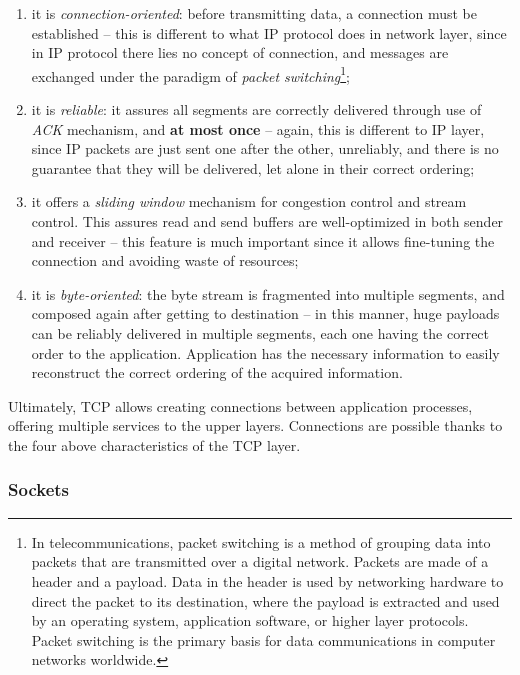 \documentclass[10pt]{\classname}
\begin{document}
\begin{enumerate}
	\item it is \emph{connection-oriented}: before transmitting data, a
		connection must be established \--- this is different to what
		IP protocol does in network layer, since in IP protocol there
        lies no concept of connection, and messages are exchanged under the
        paradigm of \emph{packet switching}\footnote{In telecommunications,
        packet switching is a method of grouping data into packets that are
    transmitted over a digital network. Packets are made of a header and a
payload. Data in the header is used by networking hardware to direct the packet
to its destination, where the payload is extracted and used by an operating
system, application software, or higher layer protocols. Packet switching is
the primary basis for data communications in computer networks worldwide. };
	\item it is \emph{reliable}: it assures all segments are correctly
		delivered through use of \emph{ACK} mechanism, and \textbf{at
		most once} \--- again, this is different to IP layer, since IP
        packets are just sent one after the other, unreliably, and there is no
        guarantee that they will be delivered, let alone in their correct
        ordering;
	\item it offers a \emph{sliding window} mechanism for congestion control
		and stream control. This assures read and send buffers are
		well-optimized in both sender and receiver \--- this feature is
		much important since it allows fine-tuning the connection and
		avoiding waste of resources;
	\item it is \emph{byte-oriented}: the byte stream is fragmented into
		multiple segments, and composed again after getting to
		destination \--- in this manner, huge payloads can be reliably
		delivered in multiple segments, each one having the correct
		order to the application. Application has the necessary information
		to easily reconstruct the correct ordering of the acquired 
		information.
\end{enumerate}

Ultimately, TCP allows creating connections between application processes,
offering multiple services to the upper layers. Connections are possible thanks
to the four above characteristics of the TCP layer.

\subsubsection{Sockets}
\end{document}
